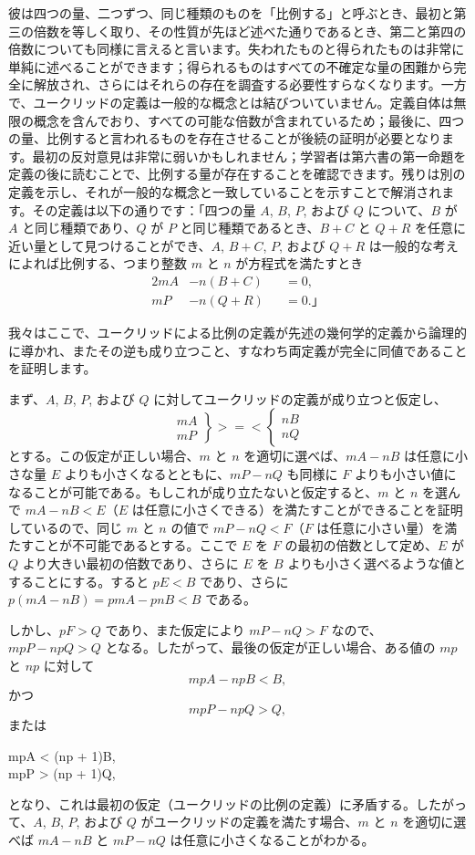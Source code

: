 \documentclass[a4paper,11pt,openany]{ltjsbook}
\newcommand{\ds}{\displaystyle}
\newcommand{\GLT}[4]{\left.\begin{array}{l}\ds#1 \\ \ds #3\end{array}\right\} >=< \left\{\begin{array}{l}\ds#2 \\ \ds #4\end{array}\right.}
\begin{document}
彼は四つの量、二つずつ、同じ種類のものを「比例する」と呼ぶとき、最初と第三の倍数を等しく取り、その性質が先ほど述べた通りであるとき、第二と第四の倍数についても同様に言えると言います。失われたものと得られたものは非常に単純に述べることができます；得られるものはすべての不確定な量の困難から完全に解放され、さらにはそれらの存在を調査する必要性すらなくなります。一方で、ユークリッドの定義は一般的な概念とは結びついていません。定義自体は無限の概念を含んでおり、すべての可能な倍数が含まれているため；最後に、四つの量、比例すると言われるものを存在させることが後続の証明が必要となります。最初の反対意見は非常に弱いかもしれません；学習者は第六書の第一命題を定義の後に読むことで、比例する量が存在することを確認できます。残りは別の定義を示し、それが一般的な概念と一致していることを示すことで解消されます。その定義は以下の通りです：「四つの量 $A$, $B$, $P$, および $Q$ について、$B$ が $A$ と同じ種類であり、$Q$ が $P$ と同じ種類であるとき、$B + C$ と $Q + R$ を任意に近い量として見つけることができ、$A$, $B + C$, $P$, および $Q + R$ は一般的な考えによれば比例する、つまり整数 $m$ と $n$ が方程式を満たすとき
\begin{alignat*}{2}
mA &- n(B + C) &&= 0, \\
mP &- n(Q + R) &&= 0. \text{」}
\end{alignat*}

我々はここで、ユークリッドによる比例の定義が先述の幾何学的定義から論理的に導かれ、またその逆も成り立つこと、すなわち両定義が完全に同値であることを証明します。

まず、$A$, $B$, $P$, および $Q$ に対してユークリッドの定義が成り立つと仮定し、
\[
\GLT{mA}{nB}{mP}{nQ}
\]
とする。この仮定が正しい場合、$m$ と $n$ を適切に選べば、$mA - nB$ は任意に小さな量 $E$ よりも小さくなるとともに、$mP - nQ$ も同様に $F$ よりも小さい値になることが可能である。もしこれが成り立たないと仮定すると、$m$ と $n$ を選んで $mA - nB < E$（$E$ は任意に小さくできる）を満たすことができることを証明しているので、同じ $m$ と $n$ の値で $mP - nQ < F$（$F$ は任意に小さい量）を満たすことが不可能であるとする。ここで $E$ を $F$ の最初の倍数として定め、$E$ が $Q$ より大きい最初の倍数であり、さらに $E$ を $B$ よりも小さく選べるような値とすることにする。すると $pE < B$ であり、さらに $p(mA - nB) = pmA - pnB < B$ である。

しかし、$pF > Q$ であり、また仮定により $mP - nQ > F$ なので、$mpP - npQ > Q$ となる。したがって、最後の仮定が正しい場合、ある値の $mp$ と $np$ に対して
\[
mpA - npB < B,
\]
かつ
\[
mpP - npQ > Q,
\]
または
\begin{center}
mpA < (np + 1)B, \\
mpP > (np + 1)Q,
\end{center}
となり、これは最初の仮定（ユークリッドの比例の定義）に矛盾する。したがって、$A$, $B$, $P$, および $Q$ がユークリッドの定義を満たす場合、$m$ と $n$ を適切に選べば $mA - nB$ と $mP - nQ$ は任意に小さくなることがわかる。
\end{document}
